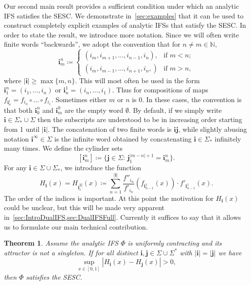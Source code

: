 \documentclass[12pt,]{article}
\newtheorem{theorem}{Theorem}[section]
\theoremstyle{definition}
\theoremstyle{remark}
\newcommand{\0}{\mathbf{0}}
\newcommand{\bi}{\mathbf{i}}
\newcommand{\bj}{\mathbf{j}}
\begin{document}
{Our second main result provides a sufficient condition under which an analytic IFS satisfies the SESC. We demonstrate in~\cref{sec:examples} that it can be used to construct completely explicit examples of analytic IFSs that satisfy the SESC. In order to state the result, we introduce more notation. Since we will often write finite words ``backwards'', we adopt the convention that for $n\neq m\in\mathbb{N}$,
\begin{equation*}
	\bi_m^n\coloneqq
	\begin{cases}
		(i_m,i_{m+1},\ldots,i_{n-1},i_n), &\text{if } m<n; \\
		(i_m,i_{m-1},\ldots,i_{n+1},i_n,) &\text{if } m>n,
	\end{cases}
\end{equation*}
where $|\bi|\geq\max\{m,n\}$. This will most often be used in the form $\bi_1^n=(i_1,\ldots,i_n)$ or $\bi_n^1=(i_n,\ldots,i_1)$. Thus for compositions of maps $f_{\bi_n^1}=f_{i_n}\circ \dots \circ f_{i_1}$. Sometimes either $m$ or $n$ is $0$. In these cases, the convention is that both $\bi_0^n$ and $\bi_m^0$ are the empty word $\emptyset$. By default, if we simply write $\bi\in\Sigma_*\cup\Sigma$ then the subscripts are understood to be in increasing order starting from 1 until $|\bi|$. The concatenation of two finite words is $\bi\bj$, while slightly abusing notation $\bi^{\infty}\in \Sigma$ is the infinite word obtained by concatenating $\bi\in\Sigma_*$ infinitely many times. We define the cylinder sets
$$[\bi_m^n] \coloneqq \big\{\bj\in\Sigma :\, \bj_1^{|m-n|+1} = \bi_m^n\big\}.$$  
For any $\bi\in \Sigma\cup\Sigma_*$, we introduce the function 
\begin{equation}\label{eq:H_i(x)}
H_{\bi}(x)=H_{\bi_{1}^{|\bi|}}(x) \coloneqq \sum_{n=1}^{|\bi|}
\frac{f''_{i_n}}{f'_{i_n}}(f_{\bi_{n-1}^1}(x))\cdot f'_{\bi_{n-1}^1}(x).
\end{equation}
The order of the indices is important. At this point the motivation for $H_{\bi}(x)$ could be unclear, but this will be made very apparent in~\cref{sec:IntroDualIFS,sec:DualIFSFull}. Currently it suffices to say that it allows us to formulate our main technical contribution.

\begin{theorem}
  \label{thm:main}
Assume the analytic IFS $\Phi$ is uniformly contracting and its attractor is not a singleton. If for all distinct $\bi,\bj \in\Sigma\cup\Sigma^*$ with $|\bi|=|\bj|$ we have
\begin{equation}\label{eq:H_iSSC}
    \sup_{x\in[0,1]} |H_{\bi}(x) - H_{\bj}(x)| > 0,
\end{equation}
then $\Phi$ satisfies the SESC.


\end{theorem}}
\end{document}
